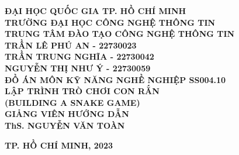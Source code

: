 \documentclass[main-report.tex]{subfiles}
\begin{document}
\begin{titlepage}
\thispagestyle{empty}
\thisfancypage{
\setlength{\fboxsep}{3pt}
\fbox}{} 
\begin{center}
{\bf\large ĐẠI HỌC QUỐC GIA TP. HỒ CHÍ MINH}\\
{\bf\subtitlesize\Large TRƯỜNG ĐẠI HỌC CÔNG NGHỆ THÔNG TIN}\\
{\bf\subtitlesize\normalsize TRUNG TÂM ĐÀO TẠO CÔNG NGHỆ THÔNG TIN}\\[3cm]

{\bf\large TRẦN LÊ PHÚ AN - 22730023}\\
{\bf\large TRẦN TRUNG NGHĨA - 22730042}\\
{\bf\large NGUYỄN THỊ NHƯ Ý - 22730059}\\[3cm]

{\bf\subtitlesize ĐỒ ÁN MÔN KỸ NĂNG NGHỀ NGHIỆP SS004.10}\\[0.5cm]
{\bf\LARGE LẬP TRÌNH TRÒ CHƠI CON RẮN}\\
{\bf\normalsize (BUILDING A SNAKE GAME)}\\[4cm]

{\bf GIẢNG VIÊN HƯỚNG DẪN}\\
{\bf ThS. NGUYỄN VĂN TOÀN}
\end{center}

\vspace{3.5cm}
\begin{center}
{\bf TP. HỒ CHÍ MINH, 2023}
\end{center}
\end{titlepage}
\end{document}

